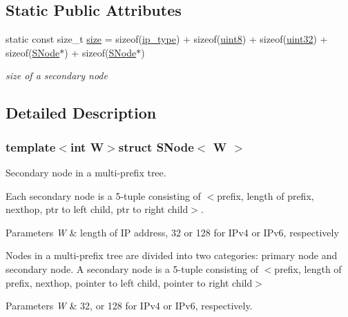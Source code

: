 \subsection*{Static Public Attributes}
\begin{DoxyCompactItemize}
\item 
static const size\-\_\-t \hyperlink{structSNode_a4c70546fd8e93c27ca5318df8f8cab35}{size} = sizeof(\hyperlink{structSNode_a1ab678513fb60d997a93e2cff3d45f3b}{ip\-\_\-type}) + sizeof(\hyperlink{types_8h_a34ecedcf03a70dc91e4616212d79267d}{uint8}) + sizeof(\hyperlink{types_8h_abd01e8e67e3d94cab04ecaaf4f85ac1b}{uint32}) + sizeof(\hyperlink{structSNode}{S\-Node}$\ast$) + sizeof(\hyperlink{structSNode}{S\-Node}$\ast$)
\begin{DoxyCompactList}\small\item\em size of a secondary node \end{DoxyCompactList}\end{DoxyCompactItemize}


\subsection{Detailed Description}
\subsubsection*{template$<$int W$>$struct S\-Node$<$ W $>$}

Secondary node in a multi-\/prefix tree. 

Each secondary node is a 5-\/tuple consisting of $<$prefix, length of prefix, nexthop, ptr to left child, ptr to right child$>$.


\begin{DoxyParams}{Parameters}
{\em W} & length of I\-P address, 32 or 128 for I\-Pv4 or I\-Pv6, respectively\\
\hline
\end{DoxyParams}
Nodes in a multi-\/prefix tree are divided into two categories\-: primary node and secondary node. A secondary node is a 5-\/tuple consisting of $<$prefix, length of prefix, nexthop, pointer to left child, pointer to right child$>$


\begin{DoxyParams}{Parameters}
{\em W} & 32, or 128 for I\-Pv4 or I\-Pv6, respectively. \\
\hline
\end{DoxyParams}


